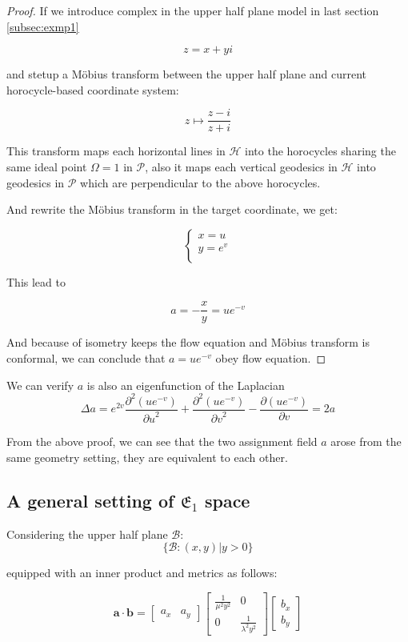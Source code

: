 \begin{proof}

If we introduce complex in the upper half plane model in last section \ref{subsec:exmp1}

$$
z = x + y i
$$

and stetup a Möbius transform between the upper half plane and current horocycle-based coordinate system:

$$
z \mapsto \frac{z-i}{z+i}
$$

This transform maps each horizontal lines in $\mathcal{H}$ into the horocycles sharing the same ideal point $\Omega = 1$ in $\mathcal{P}$,
also it maps each vertical geodesics in $\mathcal{H}$ into geodesics in $\mathcal{P}$ which are perpendicular to the above horocycles.

And rewrite the Möbius transform in the target coordinate, we get:

$$
\begin{cases}
x = u\\
y = e^v \\
\end{cases}
$$

This lead to

$$
a = -\frac{x}{y} = u e^{-v}
$$

And because of isometry keeps the flow equation and Möbius transform is conformal, we can conclude that $a = u e^{-v}$ obey flow equation.

\end{proof}

We can verify $a$ is also an eigenfunction of the Laplacian
$$
\Delta a = e^{2v} \frac{\partial^2(u e^{-v})}{{\partial u}^2} + \frac{\partial^2(u e^{-v})}{{\partial v}^2} - \frac{\partial(u e^{-v})}{\partial v} = 2a
$$

From the above proof, we can see that the two assignment field $a$ arose from the same geometry setting, they are equivalent to each other.

\subsection{A general setting of $\mathfrak{E}_1$ space}\label{subsec:generalsetting}

Considering the upper half plane $\mathcal{B}$:
$$
\{\mathcal{B}: (x, y) | y > 0 \}
$$

equipped with an inner product and metrics as follows:

$$
\mathbf{a} \cdot \mathbf{b} = \begin{bmatrix} a_x & a_y \end{bmatrix} \begin{bmatrix} \frac{1}{\mu^2 y^2} & 0 \\ 0 & \frac{1}{\lambda^2 y^2} \end{bmatrix} \begin{bmatrix} b_x \\ b_y \end{bmatrix}
$$


